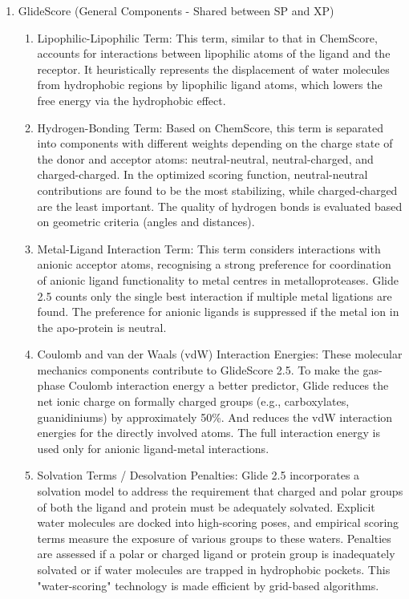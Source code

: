 \documentclass[11pt]{article}
\begin{document}
\begin{enumerate}
    \item GlideScore (General Components - Shared between SP and XP)
    \begin{enumerate}
     \item Lipophilic-Lipophilic Term: This term, similar to that in ChemScore, accounts for interactions between lipophilic atoms of the ligand and the receptor. It heuristically represents the displacement of water molecules from hydrophobic regions by lipophilic ligand atoms, which lowers the free energy via the hydrophobic effect.
     \item Hydrogen-Bonding Term: Based on ChemScore, this term is separated into components with different weights depending on the charge state of the donor and acceptor atoms: neutral-neutral, neutral-charged, and charged-charged. In the optimized scoring function, neutral-neutral contributions are found to be the most stabilizing, while charged-charged are the least important. The quality of hydrogen bonds is evaluated based on geometric criteria (angles and distances).
     \item Metal-Ligand Interaction Term: This term considers interactions with anionic acceptor atoms, recognising a strong preference for coordination of anionic ligand functionality to metal centres in metalloproteases. Glide 2.5 counts only the single best interaction if multiple metal ligations are found. The preference for anionic ligands is suppressed if the metal ion in the apo-protein is neutral.
     \item Coulomb and van der Waals (vdW) Interaction Energies: These molecular mechanics components contribute to GlideScore 2.5. To make the gas-phase Coulomb interaction energy a better predictor, Glide reduces the net ionic charge on formally charged groups (e.g., carboxylates, guanidiniums) by approximately 50\%. And reduces the vdW interaction energies for the directly involved atoms. The full interaction energy is used only for anionic ligand-metal interactions.
      \item Solvation Terms / Desolvation Penalties: Glide 2.5 incorporates a solvation model to address the requirement that charged and polar groups of both the ligand and protein must be adequately solvated. Explicit water molecules are docked into high-scoring poses, and empirical scoring terms measure the exposure of various groups to these waters. Penalties are assessed if a polar or charged ligand or protein group is inadequately solvated or if water molecules are trapped in hydrophobic pockets. This "water-scoring" technology is made efficient by grid-based algorithms.

\end{enumerate}
\end{enumerate}
\end{document}
